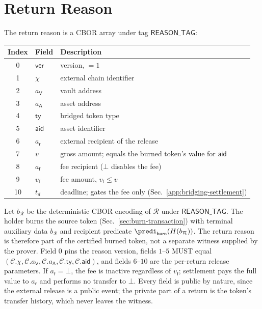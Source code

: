 \section{Return Reason}\label{app:bridging-reason}

The return reason is a CBOR array under tag $\mathsf{REASON\_TAG}$:

\begin{longtable}{clp{8.4cm}}
\textbf{Index} & \textbf{Field} & \textbf{Description} \\
\hline
\endhead
0  & $\mathsf{ver}$        & version, $=1$ \\
1  & $\chi$                & external chain identifier \\
2  & $a_\mathsf{V}$        & vault address \\
3  & $a_\mathsf{A}$        & asset address \\
4  & $\mathsf{ty}$         & bridged token type \\
5  & $\mathsf{aid}$        & asset identifier \\
6  & $a_\mathsf{r}$        & external recipient of the release \\
7  & $v$                   & gross amount; equals the burned token's value for $\mathsf{aid}$ \\
8  & $a_\mathsf{f}$        & fee recipient ($\bot$ disables the fee) \\
9  & $v_\mathsf{f}$        & fee amount, $v_\mathsf{f} \le v$ \\
10 & $t_d$                 & deadline; gates the fee only (Sec.~\ref{app:bridging-settlement}) \\
\end{longtable}

Let $b_\mathcal{R}$ be the deterministic CBOR encoding of $\mathcal{R}$ under $\mathsf{REASON\_TAG}$. The holder burns the source token (Sec.~\ref{sec:burn-transaction}) with terminal auxiliary data $b_\mathcal{R}$ and recipient predicate $\predi_\mathsf{burn}(H(b_\mathcal{R}))$. The return reason is therefore part of the certified burned token, not a separate witness supplied by the prover. Field $0$ pins the reason version, fields $1$--$5$ MUST equal $(\mathcal{C}.\chi,\mathcal{C}.a_\mathsf{V},\mathcal{C}.a_\mathsf{A},\mathcal{C}.\mathsf{ty},\mathcal{C}.\mathsf{aid})$, and fields $6$--$10$ are the per-return release parameters. If $a_\mathsf{f}=\bot$, the fee is inactive regardless of $v_\mathsf{f}$; settlement pays the full value to $a_\mathsf{r}$ and performs no transfer to $\bot$. Every field is public by nature, since the external release is a public event; the private part of a return is the token's transfer history, which never leaves the witness.

